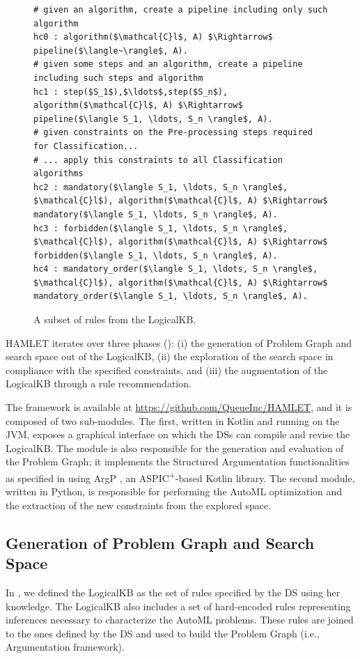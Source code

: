 \documentclass[5p,times]{elsarticle}
\newcommand{\argtup}{{Arg{\sf 2}P}}
\begin{document}
\begin{figure}[t]
\begin{lstlisting}[mathescape=true]
# given an algorithm, create a pipeline including only such algorithm
hc0 : algorithm($\mathcal{C}l$, A) $\Rightarrow$ pipeline($\langle~\rangle$, A).
# given some steps and an algorithm, create a pipeline including such steps and algorithm
hc1 : step($S_1$),$\ldots$,step($S_n$), algorithm($\mathcal{C}l$, A) $\Rightarrow$ pipeline($\langle S_1, \ldots, S_n \rangle$, A).
# given constraints on the Pre-processing steps required for Classification...
# ... apply this constraints to all Classification algorithms
hc2 : mandatory($\langle S_1, \ldots, S_n \rangle$, $\mathcal{C}l$), algorithm($\mathcal{C}l$, A) $\Rightarrow$ mandatory($\langle S_1, \ldots, S_n \rangle$, A).
hc3 : forbidden($\langle S_1, \ldots, S_n \rangle$, $\mathcal{C}l$), algorithm($\mathcal{C}l$, A) $\Rightarrow$ forbidden($\langle S_1, \ldots, S_n \rangle$, A).
hc4 : mandatory_order($\langle S_1, \ldots, S_n \rangle$, $\mathcal{C}l$), algorithm($\mathcal{C}l$, A) $\Rightarrow$ mandatory_order($\langle S_1, \ldots, S_n \rangle$, A).
\end{lstlisting}
\caption{A subset of rules from the LogicalKB.}
\label{rules-arg2p}
\end{figure}

HAMLET iterates over three phases (): (i) the generation of Problem Graph and search space out of the LogicalKB, (ii) the exploration of the search space in compliance with the specified constraints, and (iii) the augmentation of the LogicalKB through a rule recommendation.

The framework is available at \url{https://github.com/QueueInc/HAMLET}, and it is composed of two sub-modules. 
The first, written in Kotlin and running on the JVM, exposes a graphical interface on which the DSs can compile and revise the LogicalKB. 
The module is also responsible for the generation and evaluation of the Problem Graph; it implements the Structured Argumentation functionalities as specified in  using \argtup{} \cite{arg2p-jlc}, an ASPIC\textsuperscript{+}-based Kotlin library.
The second module, written in Python, is responsible for performing the AutoML optimization and the extraction of the new constraints from the explored space.

\subsection{Generation of Problem Graph and Search Space}
In , we defined the LogicalKB as the set of rules specified by the DS using her knowledge.
The LogicalKB also includes a set of hard-encoded rules representing inferences necessary to characterize the AutoML problems.
These rules are joined to the ones defined by the DS and used to build the Problem Graph (i.e., Argumentation framework).
\end{document}
